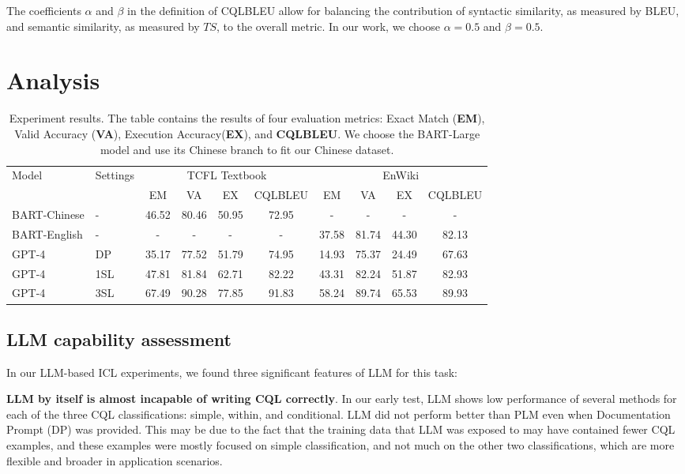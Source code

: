 \documentclass[11pt]{article}
\begin{document}
\begin{CJK*}{UTF8}{gbsn}
The coefficients $\alpha$ and $\beta$ in the definition of CQLBLEU allow for balancing the contribution of syntactic similarity, as measured by BLEU, and semantic similarity, as measured by $TS$, to the overall metric. In our work, we choose $\alpha = 0.5$ and $\beta = 0.5$. 

\section{Analysis}

\begin{table*}[ht]
\centering
\begin{tabular}{lp{2em}cccccccc}
\toprule
\multirow{2}{*}{Model} & \multirow{2}{*}{Settings} & \multicolumn{4}{c}{TCFL Textbook} & \multicolumn{4}{c}{EnWiki} \\
\cmidrule(lr){3-6} \cmidrule(lr){7-10}
      &          & EM & VA & EX & CQLBLEU & EM & VA & EX & CQLBLEU \\
\midrule
BART-Chinese & - & 46.52 & 80.46& 50.95 & 72.95 & - & -& -& - \\
BART-English         & - & - & - & - & - & 37.58 & 81.74 & 44.30 & 82.13 \\
GPT-4 & DP & 35.17 & 77.52 & 51.79 & 74.95 & 14.93 & 75.37 & 24.49 & 67.63 \\
GPT-4 & 1SL & 47.81 & 81.84 & 62.71 & 82.22 & 43.31 & 82.24 & 51.87 & 82.93 \\
GPT-4 & 3SL & 67.49 & 90.28 & 77.85 & 91.83 & 58.24 & 89.74 & 65.53 & 89.93\\
\bottomrule
\end{tabular}
\caption{Experiment results. The table contains the results of four evaluation metrics: Exact Match (\textbf{EM}), Valid Accuracy (\textbf{VA}), Execution Accuracy(\textbf{EX}), and \textbf{CQLBLEU}. We choose the BART-Large model and use its Chinese branch to fit our Chinese dataset.}
\label{tab:model_performance}
\end{table*}

\subsection{LLM capability assessment}
In our LLM-based ICL experiments, we found three significant features of LLM for this task:

\textbf{LLM by itself is almost incapable of writing CQL correctly}. In our early test, LLM shows low performance of several methods for each of the three CQL classifications: simple, within, and conditional. LLM did not perform better than PLM even when Documentation Prompt (DP) was provided. This may be due to the fact that the training data that LLM was exposed to may have contained fewer CQL examples, and these examples were mostly focused on simple classification, and not much on the other two classifications, which are more flexible and broader in application scenarios.


\end{CJK*}
\end{document}
